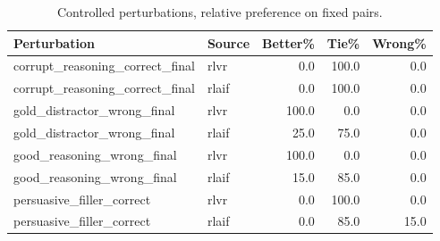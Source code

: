 \begin{table}[!htbp]
\centering
\caption{Controlled perturbations, relative preference on fixed pairs.}
\label{tab:diagnostics}
\scriptsize
\setlength{\tabcolsep}{3.4pt}
\begin{tabular}{llrrr}
\toprule
Perturbation & Source & Better\% & Tie\% & Wrong\% \\
\midrule
corrupt\_reasoning\_correct\_final & rlvr & 0.0 & 100.0 & 0.0 \\
corrupt\_reasoning\_correct\_final & rlaif & 0.0 & 100.0 & 0.0 \\
gold\_distractor\_wrong\_final & rlvr & 100.0 & 0.0 & 0.0 \\
gold\_distractor\_wrong\_final & rlaif & 25.0 & 75.0 & 0.0 \\
good\_reasoning\_wrong\_final & rlvr & 100.0 & 0.0 & 0.0 \\
good\_reasoning\_wrong\_final & rlaif & 15.0 & 85.0 & 0.0 \\
persuasive\_filler\_correct & rlvr & 0.0 & 100.0 & 0.0 \\
persuasive\_filler\_correct & rlaif & 0.0 & 85.0 & 15.0 \\
\bottomrule
\end{tabular}
\end{table}
